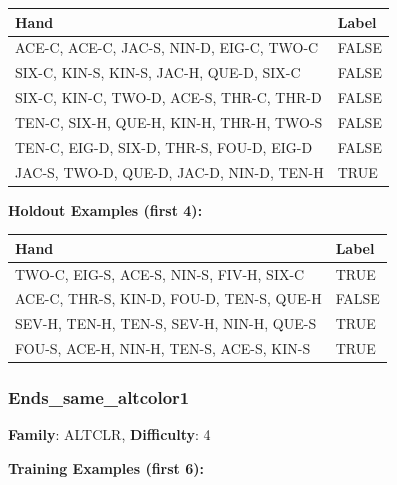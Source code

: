 \documentclass[10pt,a4paper]{article}
\begin{document}
\begin{small}
\begin{tabular}{p{8cm}l}
\toprule
Hand & Label \\
\midrule
ACE-C, ACE-C, JAC-S, NIN-D, EIG-C, TWO-C & \textcolor{negative}{FALSE} \\
SIX-C, KIN-S, KIN-S, JAC-H, QUE-D, SIX-C & \textcolor{negative}{FALSE} \\
SIX-C, KIN-C, TWO-D, ACE-S, THR-C, THR-D & \textcolor{negative}{FALSE} \\
TEN-C, SIX-H, QUE-H, KIN-H, THR-H, TWO-S & \textcolor{negative}{FALSE} \\
TEN-C, EIG-D, SIX-D, THR-S, FOU-D, EIG-D & \textcolor{negative}{FALSE} \\
JAC-S, TWO-D, QUE-D, JAC-D, NIN-D, TEN-H & \textcolor{positive}{TRUE} \\
\bottomrule
\end{tabular}
\end{small}

\textbf{Holdout Examples (first 4):}

\begin{small}
\begin{tabular}{p{8cm}l}
\toprule
Hand & Label \\
\midrule
TWO-C, EIG-S, ACE-S, NIN-S, FIV-H, SIX-C & \textcolor{positive}{TRUE} \\
ACE-C, THR-S, KIN-D, FOU-D, TEN-S, QUE-H & \textcolor{negative}{FALSE} \\
SEV-H, TEN-H, TEN-S, SEV-H, NIN-H, QUE-S & \textcolor{positive}{TRUE} \\
FOU-S, ACE-H, NIN-H, TEN-S, ACE-S, KIN-S & \textcolor{positive}{TRUE} \\
\bottomrule
\end{tabular}
\end{small}

\vspace{0.5cm}

\subsubsection{Ends\_same\_altcolor1}

\textbf{Family}: ALTCLR, \textbf{Difficulty}: 4

\textbf{Training Examples (first 6):}
\end{document}
